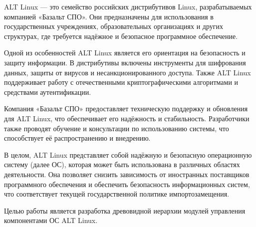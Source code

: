 \documentclass[bachelor, och, pract]{SCWorks}
\begin{document}


\tableofcontents






\intro

ALT Linux — это семейство российских дистрибутивов Linux, разрабатываемых компанией «Базальт СПО».
Они предназначены для использования в государственных учреждениях, образовательных организациях и других структурах, где требуется надёжное и безопасное программное обеспечение.

Одной из особенностей ALT Linux является его ориентация на безопасность и защиту информации.
В дистрибутивы включены инструменты для шифрования данных, защиты от вирусов и несанкционированного доступа.
Также ALT Linux поддерживает работу с отечественными криптографическими алгоритмами и средствами аутентификации.

Компания «Базальт СПО» предоставляет техническую поддержку и обновления для ALT Linux, что обеспечивает его надёжность и стабильность.
Разработчики также проводят обучение и консультации по использованию системы, что способствует её распространению и внедрению.

В целом, ALT Linux представляет собой надёжную и безопасную операционную систему (далее ОС), которая может быть использована в различных областях деятельности.
Она позволяет снизить зависимость от иностранных поставщиков программного обеспечения и обеспечить безопасность информационных систем\cite{a_basealt}, %
что соответствует текущей государственной политике импортозамещения.

Целью работы является разработка древовидной иерархии модулей управления компонентами ОС ALT Linux.
\end{document}
